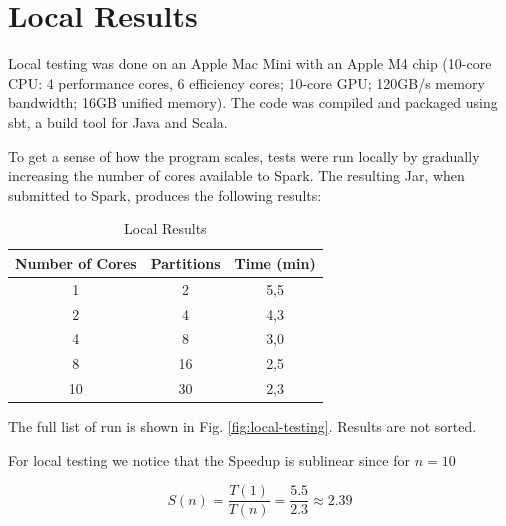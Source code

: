 \documentclass[conference]{IEEEtran}
\begin{document}

\section{Local Results}
Local testing was done on an Apple Mac Mini with an Apple M4 chip (10-core CPU: 4 performance cores, 6 efficiency cores; 10-core GPU; 120GB/s memory bandwidth; 16GB unified memory). The code was compiled and packaged using sbt, a build tool for Java and Scala. 

To get a sense of how the program scales, tests were run locally by gradually increasing the number of cores available to Spark. The resulting Jar, when submitted to Spark, produces the following results:

\begin{table}[htbp]
\caption{Local Results}
\begin{center}
\begin{tabular}{|c|c|c|}
\hline
\textbf{Number of Cores}& \textbf{Partitions} & \textbf{Time (min)}\\
\hline
1& 2& 5,5\\
\hline
2& 4& 4,3\\
\hline
4& 8& 3,0\\
\hline
8& 16& 2,5\\
\hline
10& 30& 2,3\\
\hline
\end{tabular}
\label{tab:local-results}
\end{center}
\end{table}

The full list of run is shown in Fig. \ref{fig:local-testing}. Results are not sorted.

For local testing we notice that the Speedup is sublinear since for $n=10$

\begin{equation}
    S(n) = \frac{T(1)}{T(n)} = \frac{5.5}{2.3} \approx 2.39
\end{equation}
\end{document}
